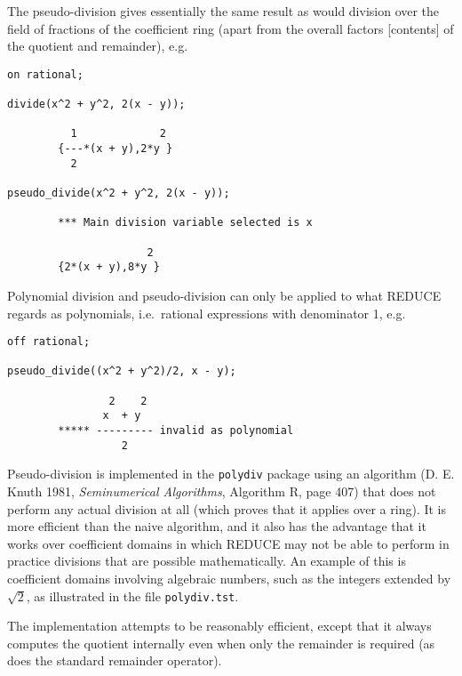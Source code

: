 \documentclass[11pt]{article}
\begin{document}
The pseudo-division gives essentially the same result as would
division over the field of fractions of the coefficient ring (apart
from the overall factors [contents] of the quotient and remainder),
e.g.
\begin{verbatim}
on rational;

divide(x^2 + y^2, 2(x - y));

          1             2
        {---*(x + y),2*y }
          2

pseudo_divide(x^2 + y^2, 2(x - y));

        *** Main division variable selected is x

                      2
        {2*(x + y),8*y }
\end{verbatim}

Polynomial division and pseudo-division can only be applied to what
REDUCE regards as polynomials, i.e.\ rational expressions with
denominator 1, e.g.
\begin{verbatim}
off rational;

pseudo_divide((x^2 + y^2)/2, x - y);

                2    2
               x  + y
        ***** --------- invalid as polynomial
                  2
\end{verbatim}

Pseudo-division is implemented in the \texttt{polydiv} package using
an algorithm (D. E. Knuth 1981, \textit{Seminumerical Algorithms},
Algorithm R, page 407) that does not perform any actual division at
all (which proves that it applies over a ring).  It is more efficient
than the naive algorithm, and it also has the advantage that it works
over coefficient domains in which REDUCE may not be able to perform in
practice divisions that are possible mathematically.  An example of
this is coefficient domains involving algebraic numbers, such as the
integers extended by $\sqrt{2}$, as illustrated in the file
\texttt{polydiv.tst}.

The implementation attempts to be reasonably efficient, except that it
always computes the quotient internally even when only the remainder
is required (as does the standard remainder operator).
\end{document}
